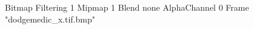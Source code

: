 {Bitmap
	{Filtering 1}
	{Mipmap 1}
	{Blend none}
	{AlphaChannel 0}
	{Frame "dodgemedic_x.tif.bmp"}
}
